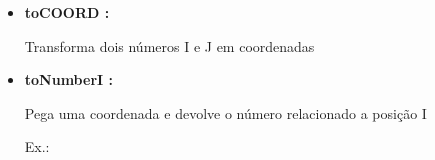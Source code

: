 \documentclass[a4paper]{article}
\begin{document}
{{{{{{{{\begin{itemize}
\begin{enumerate}
                \item Para chamá-la usamos
                    o nome da função e seus parâmetros entre 
                    parênteses, em ordem.
                    
                    \textcolor{NavyBlue}{Ex.:}
                    
                    hSquared = square(catA);
                
                \bigskip
                
                \item Para contruí-las basta usar  o tipo
                    de retorno + o nome da função e entre
                    parênteses os nomes dos parâmetros acompanhados de 
                    seus respectivos tipos. Tudo isso seguido da ação que
                    ela irá realizar entre chaves {}.
                    
                    Não esquecendo de dar
                    \textcolor{NavyBlue}{return}
                    nas funções que retornam algum tipo de dado.
                    
                    \textcolor{NavyBlue}{Ex.:}
                    
                        number square(number x)
                        
                        \{
                        
                        \ \ \ \ my j = x;
                        
                        \ \ \ \ return x*j;
                        
                        \}
                
            \end{enumerate}
            
        \bigskip      
       
        \item \textbf{toCOORD :}
            
            Transforma dois números I e J em coordenadas
        
        \bigskip      
        
        \item \textbf{toNumberI :}
            
            Pega uma coordenada e devolve o número relacionado
            a posição I
            
            \textcolor{NavyBlue}{Ex.:}
            

\end{itemize}}}}}}}}}
\end{document}

